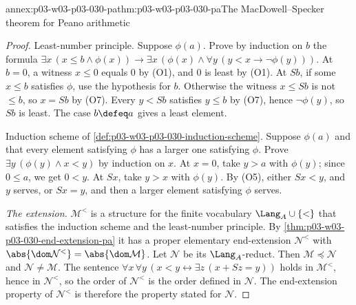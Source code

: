 \begin{annexitem}{annex:p03-w03-p03-030-pa}{thm:p03-w03-p03-030-pa}{The MacDowell--Specker theorem for Peano arithmetic}
\begin{proof}
Least-number principle.  Suppose \(\phi(a)\).  Prove by induction on \(b\)
the formula \(\exists x\,(x\le b\wedge\phi(x))\rightarrow\exists
x\,(\phi(x)\wedge\forall y\,(y<x\rightarrow\neg\phi(y)))\).  At \(b=0\), a
witness \(x\le0\) equals \(0\) by (O1), and \(0\) is least by (O1).  At
\(Sb\), if some \(x\le b\) satisfies \(\phi\), use the hypothesis for \(b\).
Otherwise the witness \(x\le Sb\) is not \(\le b\), so \(x=Sb\) by (O7).
Every \(y<Sb\) satisfies \(y\le b\) by (O7), hence \(\neg\phi(y)\), so
\(Sb\) is least.  The case \(b\defeq a\) gives a least element.

Induction scheme of \cref{def:p03-w03-p03-030-induction-scheme}.  Suppose
\(\phi(a)\) and that every element satisfying \(\phi\) has a larger one
satisfying \(\phi\).  Prove \(\exists y\,(\phi(y)\wedge x<y)\) by induction
on \(x\).  At \(x=0\), take \(y>a\) with \(\phi(y)\); since \(0\le a\), we get
\(0<y\).  At \(Sx\), take \(y>x\) with \(\phi(y)\).  By (O5), either
\(Sx<y\), and \(y\) serves, or \(Sx=y\), and then a larger element
satisfying \(\phi\) serves.

\emph{The extension.}  \(\mathcal M^<\) is a structure for the finite
vocabulary \(\Lang_A\cup\{<\}\) that satisfies the induction scheme and the
least-number principle.  By \cref{thm:p03-w03-p03-030-end-extension-pa} it
has a proper elementary end-extension \(\mathcal N^<\) with
\(\abs{\dom\mathcal N^<}=\abs{\dom\mathcal M}\).  Let \(\mathcal N\) be its
\(\Lang_A\)-reduct.  Then \(\mathcal M\preccurlyeq\mathcal N\) and
\(\mathcal N\ne\mathcal M\).  The sentence \(\forall x\,\forall y\,(x<y
\leftrightarrow\exists z\,(x+Sz=y))\) holds in \(\mathcal M^<\), hence in
\(\mathcal N^<\), so the order of \(\mathcal N^<\) is the order defined in
\(\mathcal N\).  The end-extension property of \(\mathcal N^<\) is therefore
the property stated for \(\mathcal N\).
\end{proof}
\end{annexitem}

